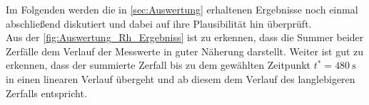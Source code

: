 Im Folgenden werden die in \cref{sec:Auswertung} erhaltenen Ergebnisse noch einmal 
abschließend diskutiert und dabei auf ihre Plausibilität hin überprüft.\\

% 
% 
%
%
%
%

Aus der \cref{fig:Auswertung_Rh_Ergebniss} ist zu erkennen, dass die Summer beider Zerfälle dem 
Verlauf der Messwerte in guter Näherung darstellt. Weiter ist gut zu erkennen, dass der summierte 
Zerfall bis zu dem gewählten Zeitpunkt $t^{*} = \SI{480}{\second}$ in einen linearen Verlauf 
übergeht und ab diesem dem Verlauf des langlebigeren Zerfalls entspricht. 